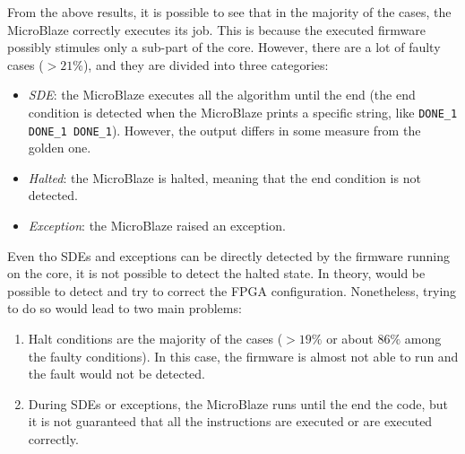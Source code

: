 


From the above results, it is possible to see that in the majority of the cases, the MicroBlaze correctly executes its job. This is because the executed firmware possibly stimules only a sub-part of the core. However, there are a lot of faulty cases ($> 21\%$), and they are divided into three categories:

\begin{itemize}
    \item \textit{SDE}: the MicroBlaze executes all the algorithm until the end (the end condition is detected when the MicroBlaze prints a specific string, like \texttt{DONE\_1 DONE\_1 DONE\_1}). However, the output differs in some measure from the golden one.
    \item \textit{Halted}: the MicroBlaze is halted, meaning that the end condition is not detected.
    \item \textit{Exception}: the MicroBlaze raised an exception.
\end{itemize}

Even tho SDEs and exceptions can be directly detected by the firmware running on the core, it is not possible to detect the halted state. In theory, would be possible to detect and try to correct the FPGA configuration. Nonetheless, trying to do so would lead to two main problems:

\begin{enumerate}
    \item Halt conditions are the majority of the cases ($> 19\%$ or about $86\%$ among the faulty conditions). In this case, the firmware is almost not able to run and the fault would not be detected.
    \item During SDEs or exceptions, the MicroBlaze runs until the end the code, but it is not guaranteed that all the instructions are executed or are executed correctly. 
\end{enumerate}

